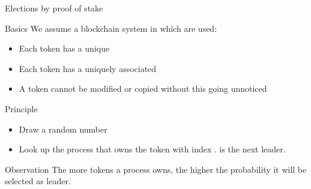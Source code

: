 \begin{frame}{Elections by proof of stake}
  \begin{block}{Basics}
    We assume a blockchain system in which   are used:
    \begin{itemize}
      \item Each token has a unique 
      \item Each token has a uniquely associated  
      \item A token cannot be modified or copied without this going unnoticed
    \end{itemize}
  \end{block}
  \begin{block}{Principle}
    \begin{itemize}
      \item Draw a random number 
      \item Look up the process  that owns the token with index .  is the
            next leader.
    \end{itemize}
  \end{block}
  \begin{alertblock}{Observation}
    The more tokens a process owns, the higher the probability it will be selected as leader.
  \end{alertblock}
\end{frame}
